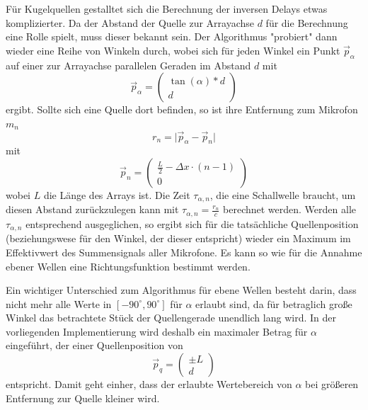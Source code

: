 	Für Kugelquellen gestalltet sich die Berechnung der inversen Delays etwas komplizierter. Da der Abstand der Quelle zur Arrayachse $d$ für die Berechnung eine Rolle spielt, muss dieser bekannt sein. Der Algorithmus "probiert" dann wieder eine Reihe von Winkeln durch, wobei sich für jeden Winkel ein Punkt $\vec{p}_{\alpha}$ auf einer zur Arrayachse parallelen Geraden im Abstand $d$ mit
	\begin{equation}\vec{p}_{\alpha} = 
		\begin{pmatrix}
			\tan(\alpha) * d \\
			d
		\end{pmatrix}
	\end{equation}
	ergibt. Sollte sich eine Quelle dort befinden, so ist ihre Entfernung zum Mikrofon $m_n$
	\begin{equation}
		r_n = \lvert \vec{p}_{\alpha} - \vec{p}_{n} \rvert
	\end{equation}
	mit
	\begin{equation}
		\vec{p}_n =
		\begin{pmatrix}
			\frac{L}{2} - \Delta x \cdot (n - 1) \\
			0
		\end{pmatrix}
	\end{equation}
	wobei $L$ die Länge des Arrays ist. Die Zeit $\tau_{\alpha, n}$, die eine Schallwelle braucht, um diesen Abstand zurückzulegen kann mit $\tau_{\alpha, n} = \frac{r_n}{c}$ berechnet werden. Werden alle $\tau_{\alpha, n}$ entsprechend ausgeglichen, so ergibt sich für die tatsächliche Quellenposition (beziehungswese für den Winkel, der dieser entspricht) wieder ein Maximum im Effektivwert des Summensignals aller Mikrofone. Es kann so wie für die Annahme ebener Wellen eine Richtungsfunktion bestimmt werden.
	
	Ein wichtiger Unterschied zum Algorithmus für ebene Wellen besteht darin, dass nicht mehr alle Werte in $[-90^{\circ}, 90^{\circ}]$ für $\alpha$ erlaubt sind, da für betraglich große Winkel das betrachtete Stück der Quellengerade unendlich lang wird. In der vorliegenden Implementierung wird deshalb ein maximaler Betrag für $\alpha$ eingeführt, der einer Quellenposition von 
	\begin{equation}
		\vec{p}_q = 
	\begin{pmatrix}
		\pm L \\
		d
	\end{pmatrix}
	\end{equation}
	entspricht. Damit geht einher, dass der erlaubte Wertebereich von $\alpha$ bei größeren Entfernung zur Quelle kleiner wird.
	

